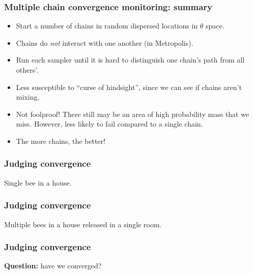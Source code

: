 \documentclass[handout]{beamer}
\begin{document}
\begin{frame}
\frametitle{Multiple chain convergence monitoring: summary}

\begin{itemize}
\item<2-> Start a number of chains in random dispersed locations in $\theta$ space. 
\item<3-> Chains do \textit{not} interact with one another (in Metropolis).
\item<4-> Run each sampler until it is hard to distinguish one chain's path from all others'.
\item<5-> Less susceptible to ``curse of hindsight'', since we can see if chains aren't mixing.
\item<6-> Not foolproof! There still may be an area of high probability mass that we miss. However, less likely to fail compared to a single chain.
\item<7-> The more chains, the better!
\end{itemize}

\end{frame}

\begin{frame}
	\frametitle{Judging convergence}
	Single bee in a house.
	
	\begin{figure}[t]
		\centerline{}
	\end{figure}
	
	
\end{frame}

\begin{frame}
	\frametitle{Judging convergence}
	Multiple bees in a house released in a single room.
	
	\begin{figure}[t]
		\centerline{}
	\end{figure}
	
	
\end{frame}

\begin{frame}
	\frametitle{Judging convergence}
	\textbf{Question:} have we converged?
	
	
	\begin{figure}[t]
		\centerline{}
	\end{figure}
	
\end{frame}
\end{document}
